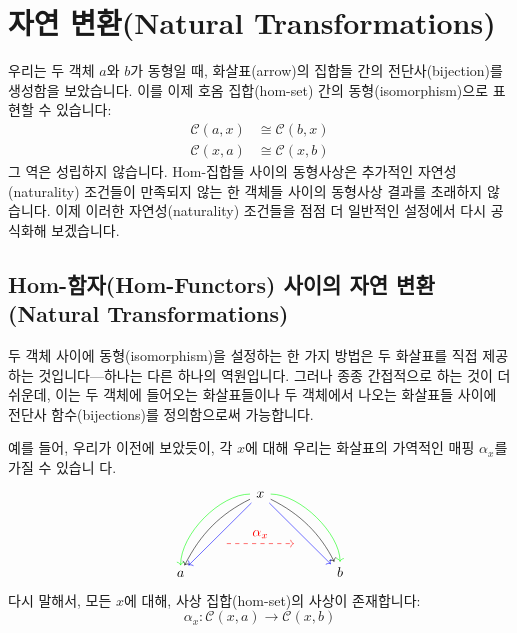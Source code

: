 \documentclass[DaoFP]{subfiles}
\begin{document}
\setcounter{chapter}{8}

\chapter{자연 변환(Natural Transformations)}

우리는 두 객체 $a$와 $b$가 동형일 때, 화살표(arrow)의 집합들 간의 전단사(bijection)를 생성함을 보았습니다. 이를 이제 호옴 집합(hom-set) 간의 동형(isomorphism)으로 표현할 수 있습니다:
\begin{align*}
\mathcal{C}(a, x) &\cong \mathcal{C}(b, x) \\
\mathcal{C}(x, a) &\cong \mathcal{C}(x, b)
\end{align*}
그 역은 성립하지 않습니다. Hom-집합들 사이의 동형사상은 추가적인 자연성(naturality) 조건들이 만족되지 않는 한 객체들 사이의 동형사상 결과를 초래하지 않습니다. 이제 이러한 자연성(naturality) 조건들을 점점 더 일반적인 설정에서 다시 공식화해 보겠습니다.

\section{Hom-함자(Hom-Functors) 사이의 자연 변환(Natural Transformations)}

두 객체 사이에 동형(isomorphism)을 설정하는 한 가지 방법은 두 화살표를 직접 제공하는 것입니다---하나는 다른 하나의 역원입니다. 그러나 종종 간접적으로 하는 것이 더 쉬운데, 이는 두 객체에 들어오는 화살표들이나 두 객체에서 나오는 화살표들 사이에 전단사 함수(bijections)를 정의함으로써 가능합니다.

예를 들어, 우리가 이전에 보았듯이, 각 $x$에 대해 우리는 화살표의 가역적인 매핑 $\alpha_x$를 가질 수 있습니 다.
\[
 \begin{tikzcd}
 \node(x) at (0, 2) {x};
 \node(a) at (-2, 0) {a};
 \node(b) at (2, 0) {b};
 \node(c1) at (-1, 1.5) {};
 \node(c2) at (-1.5, 1) {};
 \node(c3) at (-1, 2) {};
 \node(c4) at (-2, 1) {};
 \node(d1) at (1, 1.5) {};
 \node(d2) at (1.5, 1) {};
 \node(d3) at (1, 2) {};
 \node(d4) at (2, 1) {};
\node (aa) at (-1, 0.75) {};
 \node (bb) at (1, 0.75) {};
 \draw[->] (x) .. controls (c1)  and (c2) .. (a); %
 \draw[->, green] (x) .. controls (c3)  and (c4) .. (a); %
 \draw[->, blue] (x) -- (a); 
  \draw[->] (x) .. controls (d1)  and (d2) .. (b); %
 \draw[->, green] (x) .. controls (d3)  and (d4) .. (b); %
 \draw[->, blue] (x) -- (b); 
 \draw[->, red, dashed] (aa) -- node[above]{\alpha_x} (bb);
 \end{tikzcd}
\]
다시 말해서, 모든 $x$에 대해, 사상 집합(hom-set)의 사상이 존재합니다:
\[ \alpha_x \colon \mathcal{C}(x, a) \to \mathcal{C}(x, b) \]
\end{document}

